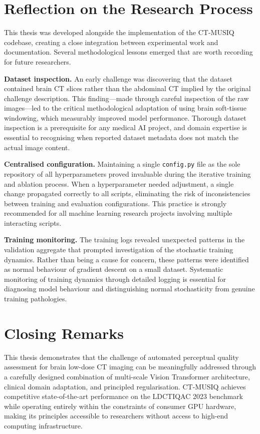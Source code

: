 \section{Reflection on the Research Process}
\label{sec:conc_reflection}

This thesis was developed alongside the implementation of the CT-MUSIQ codebase,
creating a close integration between experimental work and documentation. Several
methodological lessons emerged that are worth recording for future researchers.

\textbf{Dataset inspection.} An early challenge was discovering that the dataset
contained brain CT slices rather than the abdominal CT implied by the original challenge
description. This finding---made through careful inspection of the raw images---led
to the critical methodological adaptation of using brain soft-tissue windowing, which
measurably improved model performance. Thorough dataset inspection is a prerequisite
for any medical AI project, and domain expertise is essential to recognising when
reported dataset metadata does not match the actual image content.

\textbf{Centralised configuration.} Maintaining a single \texttt{config.py} file as the
sole repository of all hyperparameters proved invaluable during the iterative training
and ablation process. When a hyperparameter needed adjustment, a single change propagated
correctly to all scripts, eliminating the risk of inconsistencies between training and
evaluation configurations. This practice is strongly recommended for all machine learning
research projects involving multiple interacting scripts.

\textbf{Training monitoring.} The training logs revealed unexpected patterns in the
validation aggregate that prompted investigation of the stochastic training dynamics.
Rather than being a cause for concern, these patterns were identified as normal behaviour
of gradient descent on a small dataset. Systematic monitoring of training dynamics
through detailed logging is essential for diagnosing model behaviour and distinguishing
normal stochasticity from genuine training pathologies.

\section{Closing Remarks}
\label{sec:conc_closing}

This thesis demonstrates that the challenge of automated perceptual quality assessment
for brain low-dose CT imaging can be meaningfully addressed through a carefully designed
combination of multi-scale Vision Transformer architecture, clinical domain adaptation,
and principled regularisation. CT-MUSIQ achieves competitive state-of-the-art performance
on the LDCTIQAC 2023 benchmark while operating entirely within the constraints of
consumer GPU hardware, making its principles accessible to researchers without access to
high-end computing infrastructure.

